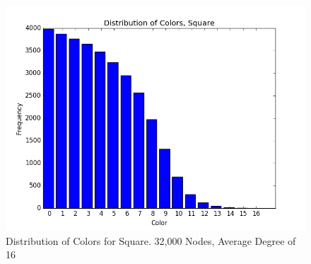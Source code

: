 \documentclass{article}
\begin{document}
\begin{figure}
    \centering
    \includegraphics[scale=0.6]{./graphs/hist_colors.png}
    \caption{Distribution of Colors for Square. 32,000 Nodes, Average Degree of 16}
    \label{distcolors}
\end{figure}

\end{document}
